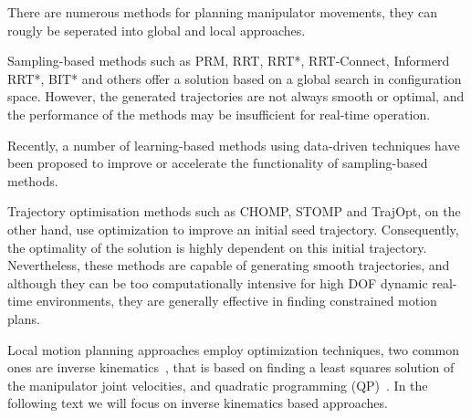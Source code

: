 \documentclass[letterpaper, 10 pt, conference]{ieeeconf}  %
\begin{document}
There are numerous methods for planning manipulator movements, they can rougly be seperated into global and local approaches. 

Sampling-based methods such as PRM, RRT, RRT*, RRT-Connect, Informerd RRT*, BIT* and others offer a solution based on a global search in configuration space. However, the generated trajectories are not always smooth or optimal, and the performance of the methods may be insufficient for real-time operation. 

Recently, a number of learning-based methods using data-driven techniques have been proposed to improve or accelerate the functionality of sampling-based methods.  

Trajectory optimisation methods such as CHOMP, STOMP and TrajOpt, on the other hand, use optimization to improve an initial seed trajectory. Consequently, the optimality of the solution is highly dependent on this initial trajectory. Nevertheless, these methods are capable of generating smooth trajectories, and although they can be too computationally intensive for high DOF dynamic real-time environments, they are generally effective in finding constrained motion plans. 

Local motion planning approaches employ optimization techniques, two common ones are inverse kinematics~\cite{c29,c38}, that is based on finding a least squares solution of the manipulator joint velocities, and quadratic programming (QP)~\cite{c21,c22,c23}. In the following text we will focus on inverse kinematics based approaches.


\end{document}
